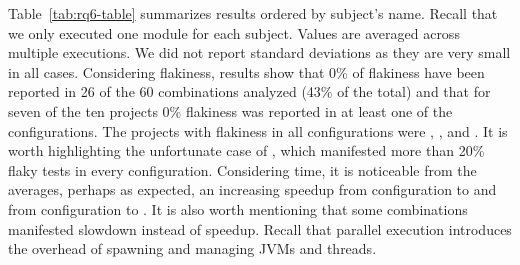 
Table~\ref{tab:rq6-table} summarizes results ordered by subject's
name. Recall that we only executed one module for each subject.
Values are averaged across multiple executions.  We did not report
standard deviations as they are very small in all cases.  Considering
flakiness, results show that 0\% of flakiness have been reported in 26
of the 60 combinations analyzed (43\% of the total) and that for seven
of the ten projects 0\% flakiness was reported in at least one of the
configurations.  The projects with flakiness in all configurations
were , , and .
It is worth highlighting the unfortunate case of ,
which manifested more than 20\% flaky tests in every configuration.
Considering time, it is noticeable from the averages, perhaps as
expected, an increasing speedup from configuration
\emph{\SeqClassParMeth} to \emph{\ParClassParMeth} and from
configuration \emph{\ForkSeq} to \emph{\ForkParMeth}.  It is also
worth mentioning that some combinations manifested slowdown instead of
speedup.  Recall that parallel execution introduces the overhead of
spawning and managing JVMs and threads.

